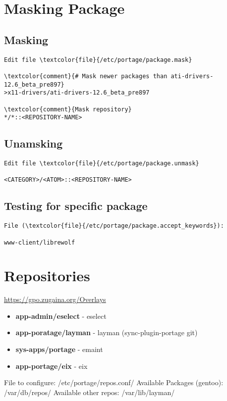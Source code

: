\documentclass[10pt, a4paper, onecolumn, openany]{book}         %
\begin{document}
\section{Masking Package}
\subsection{Masking}
\begin{Verbatim}[commandchars=\\\{\}]
Edit file \textcolor{file}{/etc/portage/package.mask}

\textcolor{comment}{# Mask newer packages than ati-drivers-12.6_beta_pre897}
>x11-drivers/ati-drivers-12.6_beta_pre897

\textcolor{comment}{Mask repository}
*/*::<REPOSITORY-NAME>
\end{Verbatim}
\subsection{Unamsking}
\begin{Verbatim}[commandchars=\\\{\}]
Edit file \textcolor{file}{/etc/portage/package.unmask}

<CATEGORY>/<ATOM>::<REPOSITORY-NAME>
\end{Verbatim}

\subsection{Testing for specific package}
\begin{Verbatim}[commandchars=\\\{\}]
File (\textcolor{file}{/etc/portage/package.accept_keywords}):

www-client/librewolf
\end{Verbatim}



\section{Repositories}
\underline{\url{https://gpo.zugaina.org/Overlays}}\newline
\begin{itemize}
    \item \textbf{app-admin/eselect} - eselect
    \item \textbf{app-poratage/layman} - layman (sync-plugin-portage git)
    \item \textbf{sys-apps/portage} - emaint
    \item \textbf{app-portage/eix} - eix
\end{itemize}
File to configure: \textcolor{dir}{/etc/portage/repos.conf/}\newline
Available Packages (gentoo): \textcolor{dir}{/var/db/repos/}\newline
Available other repos: \textcolor{dir}{/var/lib/layman/}
\end{document}

